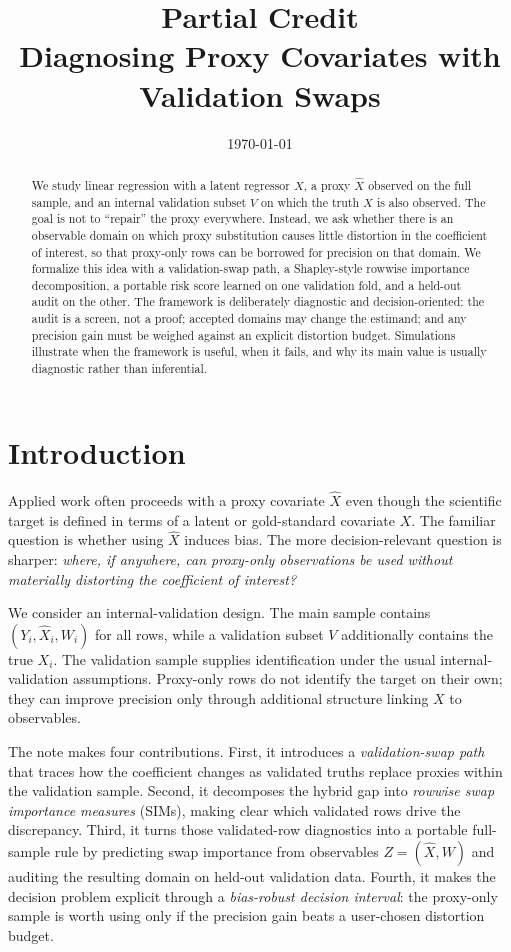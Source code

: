 \documentclass[11pt]{article}
\title{\textbf{Partial Credit}\\[0.35em]
\large Diagnosing Proxy Covariates with Validation Swaps}
\author{}
\date{\today}
\newcommand{\1}{\mathbf{1}}
\begin{document}
\maketitle

\begin{abstract}
We study linear regression with a latent regressor $X$, a proxy $\hat X$ observed on the full sample, and an internal validation subset $V$ on which the truth $X$ is also observed. The goal is not to ``repair'' the proxy everywhere. Instead, we ask whether there is an observable domain on which proxy substitution causes little distortion in the coefficient of interest, so that proxy-only rows can be borrowed for precision on that domain. We formalize this idea with a validation-swap path, a Shapley-style rowwise importance decomposition, a portable risk score learned on one validation fold, and a held-out audit on the other. The framework is deliberately diagnostic and decision-oriented: the audit is a screen, not a proof; accepted domains may change the estimand; and any precision gain must be weighed against an explicit distortion budget. Simulations illustrate when the framework is useful, when it fails, and why its main value is usually diagnostic rather than inferential.
\end{abstract}

\section{Introduction}

Applied work often proceeds with a proxy covariate $\hat X$ even though the scientific target is defined in terms of a latent or gold-standard covariate $X$. The familiar question is whether using $\hat X$ induces bias. The more decision-relevant question is sharper: \emph{where, if anywhere, can proxy-only observations be used without materially distorting the coefficient of interest?}

We consider an internal-validation design. The main sample contains $(Y_i,\hat X_i,W_i)$ for all rows, while a validation subset $V$ additionally contains the true $X_i$. The validation sample supplies identification under the usual internal-validation assumptions. Proxy-only rows do not identify the target on their own; they can improve precision only through additional structure linking $X$ to observables.

The note makes four contributions. First, it introduces a \emph{validation-swap path} that traces how the coefficient changes as validated truths replace proxies within the validation sample. Second, it decomposes the hybrid gap into \emph{rowwise swap importance measures} (SIMs), making clear which validated rows drive the discrepancy. Third, it turns those validated-row diagnostics into a portable full-sample rule by predicting swap importance from observables $Z=(\hat X,W)$ and auditing the resulting domain on held-out validation data. Fourth, it makes the decision problem explicit through a \emph{bias-robust decision interval}: the proxy-only sample is worth using only if the precision gain beats a user-chosen distortion budget.
\end{document}
